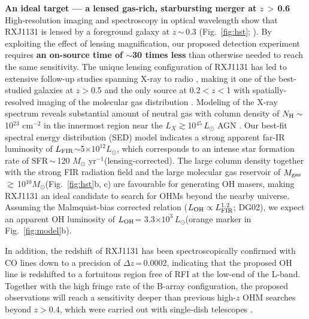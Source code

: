 \documentclass[letterpaper,11pt]{article}
\newcommand{\Lsun}{\mbox{$L_{\odot}$}\xspace}
\newcommand{\Msun}{\mbox{$M_{\odot}$}\xspace}
\newcommand{\LFIR}{\mbox{$L_{\rm FIR}$}\xspace}
\newcommand{\LOH}{$L_{\rm OH}$\xspace}
\newcommand{\pmOne}{\mbox{$^{-1}$}\xspace}
\newcommand{\Fig}[1]{Fig.~\ref{fig:#1}}
\newcommand{\E}[1]{\mbox{$\times10^{#1}$}}
\newcommand{\eq}{\,=\,}
\newcommand{\ssim}{\,$\sim$\,}
\newcommand{\obs}{observations\xspace}
\begin{document}
\noindent \textbf{An ideal target --- a lensed gas-rich, starbursting merger at $z$\,$>$\,0.6}\\
\noindent High-resolution imaging and spectroscopy in optical wavelength show that RXJ1131 is 
lensed by a foreground galaxy at $z$\ssim0.3 (\Fig{hst}; \citealt{Sluse03a}).
By exploiting the effect of lensing magnification, 
our proposed detection experiment requires {\bf an on-source time of  %
$\sim$30 times less} than otherwise needed to reach the same sensitivity. 
The unique lensing configuration of RXJ1131 has led to extensive follow-up studies spanning X-ray to radio \citep[\Fig{hst}e; e.g.,][]{Claeskens06a, Sluse07a, Leung17a}, 
making it one of the best-studied galaxies at $z$$>$0.5 and 
the only source at 0.2$<$$z$$<$1 with spatially-resolved imaging of the molecular gas distribution \citep{Leung17a}. 
Modeling of the X-ray spectrum reveals substantial amount of neutral gas with column density of
$N_{\rm H}\sim$10$^{23}$ cm$^{-2}$ in the innermost region near %
the $L_X$$\gtrsim$10$^{45}$\,\Lsun AGN \citep{Pooley07a, Reis14a}. 
Our best-fit spectral energy distribution (SED) model indicates
a strong apparent far-IR luminosity of \LFIR$\sim$5\E{12}\Lsun, which corresponds to
an intense star formation rate of SFR\ssim120 \Msun yr\pmOne (lensing-corrected).
The large column density together with the strong FIR radiation field %
and the large molecular gas reservoir of $M_{\rm gas}$\,$\gtrsim$\,10$^{10}$\Msun (\Fig{hst}b, c) 
are favourable for generating OH masers, making RXJ1131 an ideal candidate 
to search for OHMs beyond the nearby universe. Assuming the Malmquist-bias corrected relation
($L_{\rm OH}\propto L_{\rm FIR}^{1.2}$; DG02), we expect an apparent OH luminosity of \LOH= 3.3\E{3}\,\Lsun (orange marker in \Fig{model}b).

\noindent In addition, the redshift of RXJ1131 has been spectroscopically confirmed with CO lines down to a precision of 
$\Delta z$\eq0.0002, indicating that the proposed OH line is redshifted to a fortuitous region 
free of RFI at the low-end of the L-band. 
Together with the high fringe rate of the B-array configuration, the proposed \obs will
reach a sensitivity deeper than previous high-$z$ OHM searches beyond $z$$>$0.4, which were carried out 
with single-dish telescopes \citep[\Fig{model}b; e.g.][]{Darling02a, Willett12a}.
\end{document}
